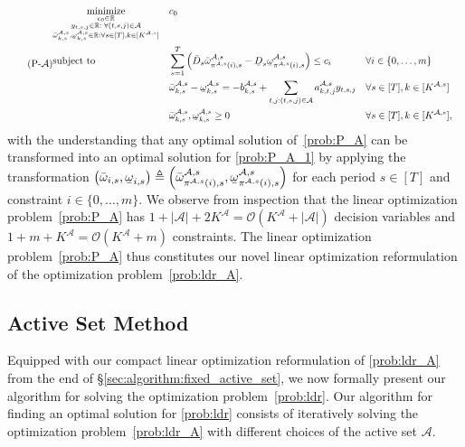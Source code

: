 \documentclass[nonblindrev,mnsc]{informs3} %
\def\Real{\mathbb{R}}
\let\R\Real
\newcommand{\ubar}[1]{\text{\b{$#1$}}}
\begin{document}
\begin{equation}  \tag{P-$\mathcal{A}$}\label{prob:P_A}
\begin{aligned}
&\underset{\substack{c_0 \in \R\\y_{t,s,j} \in \R :\;  \forall (t,s,j) \in \mathcal{A}\\ \bar{\omega}^{\mathcal{A},s}_{k,s}, \ubar{\omega}^{\mathcal{A},s}_{k,s} \in \R: \forall s \in [T], k \in [K^{\mathcal{A},s}]}}{\textnormal{minimize}}&& c_0 \\
&\textnormal{subject to}&&\sum_{s =1}^T \left(  \bar{D}_s  \bar{\omega}^{\mathcal{A},s}_{\pi^{\mathcal{A},s}(i),s}  - \ubar{D}_s \ubar{\omega}^{\mathcal{A},s}_{\pi^{\mathcal{A},s}(i),s}  \right) \le c_i  && \forall i \in \{0,\ldots,m\} \\
    &&&\bar{\omega}^{\mathcal{A},s}_{k,s}  - \ubar{\omega}^{\mathcal{A},s}_{k,s}  =   - b^{\mathcal{A},s}_{k,s} + \sum_{t,j: (t,s,j) \in \mathcal{A}} a_{k,t,j}^{\mathcal{A},s} y_{t,s,j}  && \forall s \in [T], k \in [K^{\mathcal{A},s}] \\
    &&&  \bar{\omega}^{\mathcal{A},s}_{k,s} , \ubar{\omega}^{\mathcal{A},s}_{k,s}  \ge 0 && \forall s \in [T], k \in [K^{\mathcal{A},s}],
\end{aligned}
\end{equation} with the understanding that any optimal solution of~\eqref{prob:P_A} can be transformed into an optimal solution for \eqref{prob:P_A_1} by applying the  transformation $\left( \bar{\omega}_{i,s},\ubar{\omega}_{i,s} \right) \triangleq \left( \bar{\omega}^{\mathcal{A},s}_{\pi^{\mathcal{A},s}(i),s},\ubar{\omega}^{\mathcal{A},s}_{\pi^{\mathcal{A},s}(i),s} \right) $ for each period $s \in [T]$ and constraint $i \in \{0,\ldots,m\}$. We observe from inspection that the linear optimization problem~\eqref{prob:P_A} has $1 + | \mathcal{A}| + 2 K^{\mathcal{A}} = \mathcal{O}\left( K^{\mathcal{A}}  + | \mathcal{A}|  \right) $ decision variables and $1 + m + K^{\mathcal{A}} = \mathcal{O} \left( K^{\mathcal{A}}  +m  \right)$ constraints. The linear optimization problem~\eqref{prob:P_A} thus constitutes our novel linear optimization reformulation of the optimization problem~\eqref{prob:ldr_A}.  




\subsection{Active Set Method} \label{sec:algorithm:activeset}
Equipped with our compact linear optimization reformulation of \eqref{prob:ldr_A} from the end of \S\ref{sec:algorithm:fixed_active_set}, we now formally present our algorithm for solving the optimization problem~\eqref{prob:ldr}. 
Our algorithm for finding an optimal solution for \eqref{prob:ldr} consists of iteratively  solving the optimization problem~\eqref{prob:ldr_A} with different choices of the active set $\mathcal{A}$. 
\end{document}
